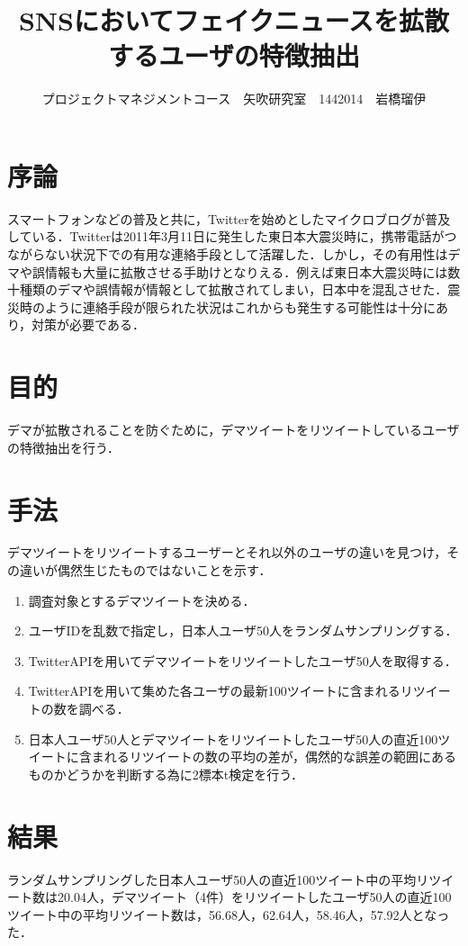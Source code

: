 \documentclass[uplatex,twocolumn,dvipdfmx]{jsarticle}
\title{\vspace{-5mm}\fontsize{14pt}{0pt}\selectfont SNSにおいてフェイクニュースを拡散するユーザの特徴抽出}
\author{\normalsize プロジェクトマネジメントコース　矢吹研究室　1442014　岩橋瑠伊}
\date{}
\begin{document}
\fontsize{10.5pt}{\baselineskip}\selectfont
\maketitle





\section{序論}
スマートフォンなどの普及と共に，Twitterを始めとしたマイクロブログが普及している．Twitterは2011年3月11日に発生した東日本大震災時に，携帯電話がつながらない状況下での有用な連絡手段として活躍した．しかし，その有用性はデマや誤情報も大量に拡散させる手助けとなりえる．例えば東日本大震災時には数十種類のデマや誤情報が情報として拡散されてしまい，日本中を混乱させた．震災時のように連絡手段が限られた状況はこれからも発生する可能性は十分にあり，対策が必要である\cite{dema1}．

\section{目的}
デマが拡散されることを防ぐために，デマツイートをリツイートしているユーザの特徴抽出を行う．

\section{手法}
デマツイートをリツイートするユーザーとそれ以外のユーザの違いを見つけ，その違いが偶然生じたものではないことを示す．
\begin{enumerate}
\item 調査対象とするデマツイートを決める．
\item ユーザIDを乱数で指定し，日本人ユーザ50人をランダムサンプリングする．
\item TwitterAPIを用いてデマツイートをリツイートしたユーザ50人を取得する．
\item TwitterAPIを用いて集めた各ユーザの最新100ツイートに含まれるリツイートの数を調べる．
\item 日本人ユーザ50人とデマツイートをリツイートしたユーザ50人の直近100ツイートに含まれるリツイートの数の平均の差が，偶然的な誤差の範囲にあるものかどうかを判断する為に2標本t検定を行う．
\end{enumerate}

\section{結果}
ランダムサンプリングした日本人ユーザ50人の直近100ツイート中の平均リツイート数は20.04人，デマツイート（4件）をリツイートしたユーザ50人の直近100ツイート中の平均リツイート数は，56.68人，62.64人，58.46人，57.92人となった．
\end{document}
